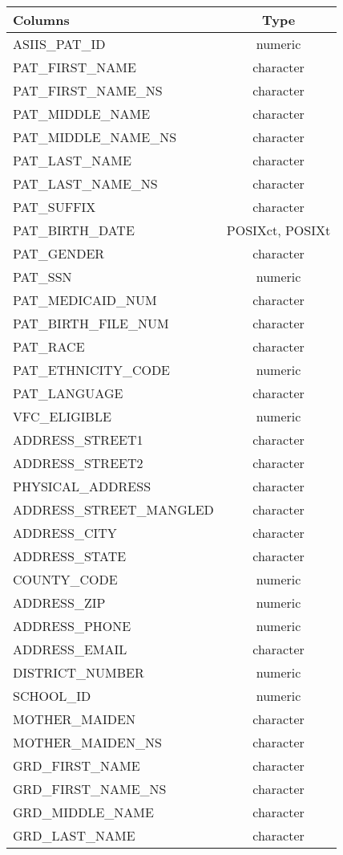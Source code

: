 \documentclass[
  letterpaper,
  DIV=11,
  numbers=noendperiod]{scrreprt}
\begin{document}
\begin{longtable}{lc}
\toprule
Columns & Type \\ 
\midrule
ASIIS\_PAT\_ID & numeric \\ 
PAT\_FIRST\_NAME & character \\ 
PAT\_FIRST\_NAME\_NS & character \\ 
PAT\_MIDDLE\_NAME & character \\ 
PAT\_MIDDLE\_NAME\_NS & character \\ 
PAT\_LAST\_NAME & character \\ 
PAT\_LAST\_NAME\_NS & character \\ 
PAT\_SUFFIX & character \\ 
PAT\_BIRTH\_DATE & POSIXct, POSIXt \\ 
PAT\_GENDER & character \\ 
PAT\_SSN & numeric \\ 
PAT\_MEDICAID\_NUM & character \\ 
PAT\_BIRTH\_FILE\_NUM & character \\ 
PAT\_RACE & character \\ 
PAT\_ETHNICITY\_CODE & numeric \\ 
PAT\_LANGUAGE & character \\ 
VFC\_ELIGIBLE & numeric \\ 
ADDRESS\_STREET1 & character \\ 
ADDRESS\_STREET2 & character \\ 
PHYSICAL\_ADDRESS & character \\ 
ADDRESS\_STREET\_MANGLED & character \\ 
ADDRESS\_CITY & character \\ 
ADDRESS\_STATE & character \\ 
COUNTY\_CODE & numeric \\ 
ADDRESS\_ZIP & numeric \\ 
ADDRESS\_PHONE & numeric \\ 
ADDRESS\_EMAIL & character \\ 
DISTRICT\_NUMBER & numeric \\ 
SCHOOL\_ID & numeric \\ 
MOTHER\_MAIDEN & character \\ 
MOTHER\_MAIDEN\_NS & character \\ 
GRD\_FIRST\_NAME & character \\ 
GRD\_FIRST\_NAME\_NS & character \\ 
GRD\_MIDDLE\_NAME & character \\ 
GRD\_LAST\_NAME & character \\ 

\end{longtable}
\end{document}
